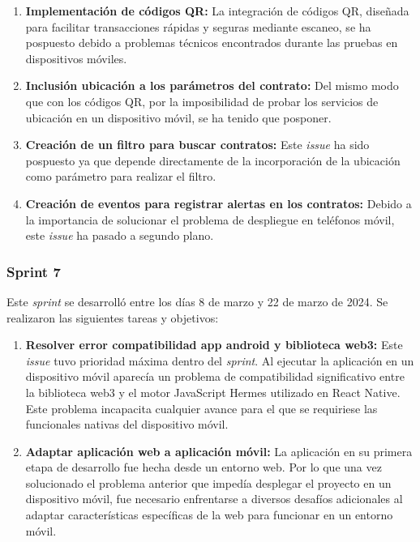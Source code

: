 \begin{enumerate}

\item \textbf{Implementación de códigos QR:} La integración de códigos QR, diseñada para facilitar transacciones rápidas y seguras mediante escaneo, se ha pospuesto debido a problemas técnicos encontrados durante las pruebas en dispositivos móviles.

\item \textbf{Inclusión ubicación a los parámetros del contrato:} Del mismo modo que con los códigos QR, por la imposibilidad de probar los servicios de ubicación en un dispositivo móvil, se ha tenido que posponer.

\item \textbf{Creación de un filtro para buscar contratos:}  Este \textit{issue} ha sido pospuesto ya que depende directamente de la incorporación de la ubicación como parámetro para realizar el filtro.

\item \textbf{Creación de eventos para registrar alertas en los contratos:} Debido a la importancia de solucionar el problema de despliegue en teléfonos móvil, este \textit{issue} ha pasado a segundo plano.

\end{enumerate}


\subsubsection{Sprint 7}

Este \textit{sprint} se desarrolló entre los días 8 de marzo y 22 de marzo de 2024. Se realizaron las siguientes tareas y objetivos:

\begin{enumerate}

\item \textbf{Resolver error compatibilidad app android y biblioteca web3:} Este \textit{issue} tuvo prioridad máxima dentro del \textit{sprint}. Al ejecutar la aplicación en un dispositivo móvil aparecía un problema de compatibilidad significativo entre la biblioteca web3 y el motor JavaScript Hermes utilizado en React Native.
Este problema incapacita cualquier avance para el que se requiriese las funcionales nativas del dispositivo móvil.

\item \textbf{Adaptar aplicación web a aplicación móvil:} La aplicación en su primera etapa de desarrollo fue hecha desde un entorno web. Por lo que una vez solucionado el problema anterior que impedía desplegar el proyecto en un dispositivo móvil, fue necesario enfrentarse a diversos desafíos adicionales al adaptar características específicas de la web para funcionar en un entorno móvil.

\end{enumerate}

